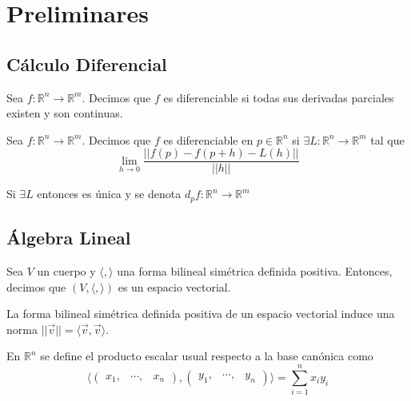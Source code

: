 \chapter{Preliminares}

\section{Cálculo Diferencial}

\begin{defn}
  Sea $f: \mathbb{R}^{n} \to \mathbb{R}^{m}$. Decimos que $f$ es diferenciable si todas sus derivadas parciales existen y son continuas.
\end{defn}

\begin{defn}[Diferenciabilidad]
  Sea $f: \mathbb{R}^{n} \to \mathbb{R}^{m}$. Decimos que $f$ es diferenciable en $p \in \mathbb{R}^{n}$ si $\exists L: \mathbb{R}^{n} \to \mathbb{R}^{m}$ tal que 
  \[
    \lim_{h \to 0} \frac{||f(p) - f(p + h) - L(h)||}{||h||}
  \] 
\end{defn}

\begin{obs}
  Si $\exists L$ entonces es única  y se denota $ d_{p}f: \mathbb{R}^{n} \to \mathbb{R}^{m}$
\end{obs}

\section{Álgebra Lineal}

\begin{defn}
  Sea $V$ un cuerpo y $\langle { , } \rangle$ una forma bilineal simétrica definida positiva. Entonces, decimos que $(V, \langle { , } \rangle)$ es un espacio vectorial.
\end{defn}

\begin{obs}
  La forma bilineal simétrica definida positiva de un espacio vectorial induce una norma $||\vec{v}|| = \langle \vec{v}{ , }\vec{v} \rangle$.
\end{obs}

\begin{defn}
  En $\mathbb{R}^{n}$ se define el producto escalar usual respecto a la base canónica como
  \[ 
    \langle \begin{pmatrix}
      x_{1}, & \cdots, & x_{n}
    \end{pmatrix}{ , }\begin{pmatrix}
      y_{1}, & \cdots, & y_{n}
    \end{pmatrix} \rangle = \sum_{i = 1}^{n} x_{i} y_{i}
  \] 
\end{defn}

